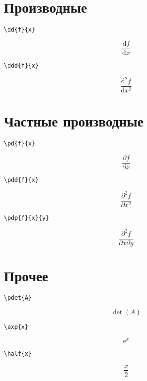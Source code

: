 \documentclass[a4paper,12pt]{article}
\renewcommand{\d}{\mathrm{d}}
\newcommand{\dd}[2]{\frac{\d{#1}}{\d{#2}}}
\newcommand{\ddd}[2]{\frac{\d^2{#1}}{\d{#2}^2}}
\newcommand{\pd}[2]{\frac{\partial{#1}}{\partial{#2}}}
\newcommand{\pdd}[2]{\frac{\partial^2{#1}}{\partial{#2}^2}}
\newcommand{\pdp}[3]{\frac{\partial^2{#1}}{\partial{#2}\partial{#3}}}
\newcommand{\pdet}[1]{\det\left({#1}\right)}
\renewcommand{\exp}[1]{\mathrm{e}^{#1}}
\newcommand{\half}[1]{\frac{#1}{2}}
\begin{document}
\section*{Производные}

\begin{verbatim}
\dd{f}{x}
\end{verbatim}
$$\dd{f}{x}$$

\begin{verbatim}
\ddd{f}{x}
\end{verbatim}
$$\ddd{f}{x}$$


\section*{Частные производные}

\begin{verbatim}
\pd{f}{x}
\end{verbatim}
$$\pd{f}{x}$$

\begin{verbatim}
\pdd{f}{x}
\end{verbatim}
$$\pdd{f}{x}$$

\begin{verbatim}
\pdp{f}{x}{y}
\end{verbatim}
$$\pdp{f}{x}{y}$$

\section*{Прочее}

\begin{verbatim}
\pdet{A}
\end{verbatim}
$$\pdet{A}$$

\begin{verbatim}
\exp{x}
\end{verbatim}
$$\exp{x}$$

\begin{verbatim}
\half{x}
\end{verbatim}
$$\half{x}$$
\end{document}
